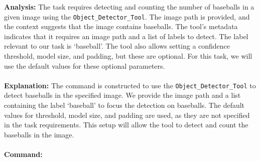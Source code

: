    
    \begin{executorbox}
    
    \textbf{Analysis:}
    The task requires detecting and counting the number of baseballs in a given image using the \texttt{Object\_Detector\_Tool}. The image path is provided, and the context suggests that the image contains baseballs. The tool's metadata indicates that it requires an image path and a list of labels to detect. The label relevant to our task is `baseball'. The tool also allows setting a confidence threshold, model size, and padding, but these are optional. For this task, we will use the default values for these optional parameters.
    \\\\
    \textbf{Explanation:}
    The command is constructed to use the \texttt{Object\_Detector\_Tool} to detect baseballs in the specified image. We provide the image path and a list containing the label `baseball' to focus the detection on baseballs. The default values for threshold, model size, and padding are used, as they are not specified in the task requirements. This setup will allow the tool to detect and count the baseballs in the image.
    \\\\
    \textbf{Command:}
    \end{executorbox}
    
    
    \begin{executorbox}
    \begin{codebox}
    \end{codebox}
    \end{executorbox}
    
